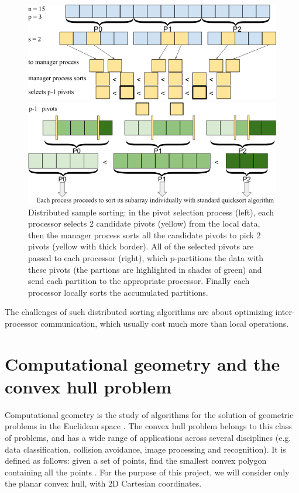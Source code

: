 \documentclass[]{finalproject}
\begin{document}
\begin{figure}[H]
\centering
\begin{minipage}{.49\linewidth}
\includegraphics[width=\linewidth]{par-qs-1.png}
\end{minipage}
\begin{minipage}{.49\linewidth}
\includegraphics[width=\linewidth]{par-qs-2.png}
\end{minipage}
\caption{Distributed sample sorting: in the pivot selection process (left), each processor selects 2 candidate pivots (yellow) from the local data, then the manager process sorts all the candidate pivots to pick 2 pivots (yellow with thick border). All of the selected pivots are passed to each processor (right), which $p$-partitions the data with these pivots (the partions are highlighted in shades of green) and send each partition to the appropriate processor. Finally each processor locally sorts the accumulated partitions.}
\label{fig:par-qs}
\end{figure}

The challenges of such distributed sorting algorithms are about optimizing inter-processor communication, which usually cost much more than local operations.

\section{Computational geometry and the convex hull problem}
Computational geometry is the study of algorithms for the solution of geometric problems in the Euclidean space \cite{jaja2000perspective}.
The convex hull problem belongs to this class of problems, and has a wide range of applications across several disciplines
(e.g. data classification, collision avoidance, image processing and recognition). It is defined as follows:
given a set of points, find the smallest convex polygon containing all the points \cite{geowiki}.
For the purpose of this project, we will consider only the planar convex hull, with 2D Cartesian coordinates.
\end{document}

